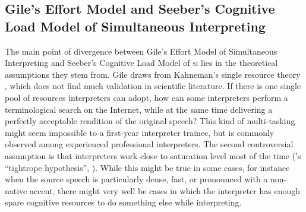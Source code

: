 \documentclass[output=paper]{langsci/langscibook}
\begin{document}
\subsection{Gile’s Effort Model and Seeber’s Cognitive Load Model of Simultaneous Interpreting}\label{sec:prandi:2.1}
The main point of divergence between Gile’s Effort Model of Simultaneous Interpreting \citep{Gile1988, Gile1997, Gile1999} and Seeber’s Cognitive Load Model of \textsc{si} lies in the theoretical assumptions they stem from. Gile draws from Kahneman’s single resource theory \citep{Kahneman1973}, which does not find much validation in scientific literature. If there is one single pool of resources interpreters can adopt, how can some interpreters perform a terminological search on the Internet, while at the same time delivering a perfectly acceptable rendition of the original speech? This kind of multi-tasking might seem impossible to a first-year interpreter trainee, but is commonly observed among experienced professional interpreters. The second controversial assumption is that interpreters work close to saturation level most of the time (\citeauthor{Gile1999}’s ``tightrope hypothesis'', \citeyear{Gile1999}). While this might be true in some cases, for instance when the source speech is particularly dense, fast, or pronounced with a non-native accent, there might very well be cases in which the interpreter has enough spare cognitive resources to do something else while interpreting. 
\end{document}
